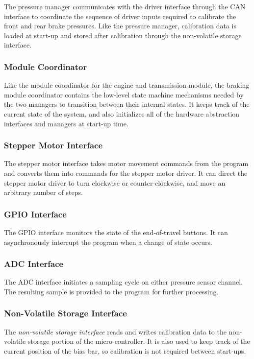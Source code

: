 The pressure manager communicates with the driver interface through the CAN interface to coordinate the sequence of driver inputs required to calibrate the front and rear brake pressures. Like the pressure manager, calibration data is loaded at start-up and stored after calibration through the non-volatile storage interface.

\subsubsection{Module Coordinator}

Like the module coordinator for the engine and transmission module, the braking module coordinator contains the low-level state machine mechanisms needed by the two managers to transition between their internal states. It keeps track of the current state of the system, and also initializes all of the hardware abstraction interfaces and managers at start-up time. 

\subsubsection{Stepper Motor Interface}

The stepper motor interface takes motor movement commands from the program and converts them into commands for the stepper motor driver. It can direct the stepper motor driver to turn clockwise or counter-clockwise, and move an arbitrary number of steps. 

\subsubsection{GPIO Interface}

The GPIO interface monitors the state of the end-of-travel buttons. It can asynchronously interrupt the program when a change of state occurs. 

\subsubsection{ADC Interface}  

The ADC interface initiates a sampling cycle on either pressure sensor channel. The resulting sample is provided to  the program for further processing. 

\subsubsection{Non-Volatile Storage Interface}

The \emph{non-volatile storage interface} reads and writes calibration data to the non-volatile storage portion of the micro-controller. It is also used to keep track of the current position of the bias bar, so calibration is not required between start-ups.

